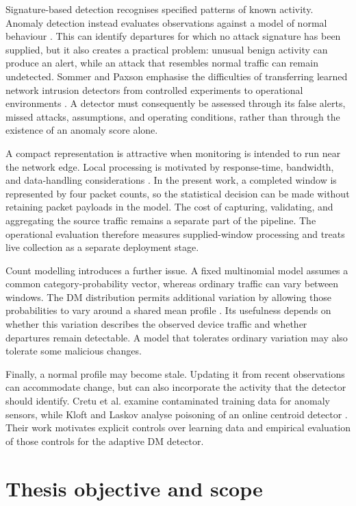 Signature-based detection recognises specified patterns of known activity.
Anomaly detection instead evaluates observations against a model of normal
behaviour \cite{chandola2009}. This can identify departures for which no
attack signature has been supplied, but it also creates a practical
problem: unusual benign activity can produce an alert, while an attack
that resembles normal traffic can remain undetected. Sommer and Paxson
emphasise the difficulties of transferring learned network intrusion
detectors from controlled experiments to operational environments
\cite{sommer2010}. A detector must consequently be assessed through its
false alerts, missed attacks, assumptions, and operating conditions, rather
than through the existence of an anomaly score alone.

A compact representation is attractive when monitoring is intended to run
near the network edge. Local processing is motivated by response-time,
bandwidth, and data-handling considerations \cite{shi2016}. In the present
work, a completed window is represented by four packet counts, so the
statistical decision can be made without retaining packet payloads in the
model. The cost of capturing, validating, and aggregating the source
traffic remains a separate part of the pipeline. The operational evaluation
therefore measures supplied-window processing and treats live collection as
a separate deployment stage.

Count modelling introduces a further issue. A fixed multinomial model
assumes a common category-probability vector, whereas ordinary traffic can
vary between windows. The DM distribution permits additional variation by
allowing those probabilities to vary around a shared mean profile
\cite{yu2014,alhajbaddar2025analysis}. Its usefulness depends on whether this
variation describes the observed device traffic and whether departures
remain detectable. A model that tolerates ordinary variation may also
tolerate some malicious changes.

Finally, a normal profile may become stale. Updating it from recent
observations can accommodate change, but can also incorporate the activity
that the detector should identify. Cretu et al. examine contaminated
training data for anomaly sensors, while Kloft and Laskov analyse poisoning
of an online centroid detector \cite{cretu2008,kloft2012}. Their work
motivates explicit controls over learning data and empirical evaluation of
those controls for the adaptive DM detector.

\section{Thesis objective and scope}

